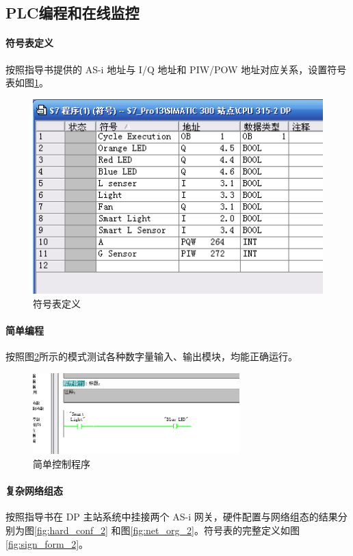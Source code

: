\subsection{PLC编程和在线监控}
\paragraph{符号表定义}
按照指导书提供的 AS-i 地址与 I/Q 地址和 PIW/POW 地址对应关系，设置符号表如图\ref{fig:sign_form}。

\begin{figure}[htbp]
\centering
\includegraphics[width=12cm]{resource/sign_form.png}
\caption{符号表定义}
\label{fig:sign_form}
\end{figure}

\paragraph{简单编程}
按照图\ref{fig:easy}所示的模式测试各种数字量输入、输出模块，均能正确运行。

\begin{figure}[htbp]
\centering
\includegraphics[width=8cm]{resource/program_easy.png}
\caption{简单控制程序}
\label{fig:easy}
\end{figure}

\paragraph{复杂网络组态}
按照指导书在 {\ttfamily DP} 主站系统中挂接两个 {\ttfamily AS-i} 网关，硬件配置与网络组态的结果分别为图\ref{fig:hard_conf_2} 和图\ref{fig:net_org_2}。符号表的完整定义如图\ref{fig:sign_form_2}。

